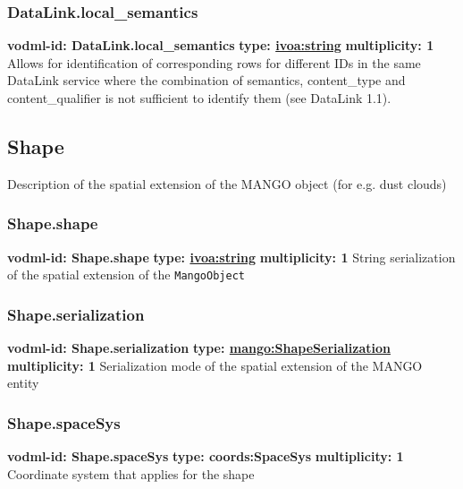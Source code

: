     \subsubsection{DataLink.local\_semantics}
    \textbf{vodml-id: DataLink.local\_semantics} \newline
    \textbf{type: \hyperref[sect:ivoa]{ivoa:string}} \newline
    \textbf{multiplicity: 1} \newline
    Allows for identification of corresponding rows for different IDs in the same DataLink service where the combination of semantics, content\_type and content\_qualifier is not sufficient to identify them (see DataLink 1.1).

  \subsection{Shape}
    \label{sect:Shape}
    Description of the spatial extension of the MANGO object (for e.g. dust clouds)

    \subsubsection{Shape.shape}
    \textbf{vodml-id: Shape.shape} \newline
    \textbf{type: \hyperref[sect:ivoa]{ivoa:string}} \newline
    \textbf{multiplicity: 1} \newline
    String serialization of the spatial extension of the \texttt{MangoObject}

    \subsubsection{Shape.serialization}
    \textbf{vodml-id: Shape.serialization} \newline
    \textbf{type: \hyperref[sect:ShapeSerialization]{mango:ShapeSerialization}} \newline
    \textbf{multiplicity: 1} \newline
    Serialization mode of the spatial extension of the MANGO entity

    \subsubsection{Shape.spaceSys}
    \textbf{vodml-id: Shape.spaceSys} \newline
    \textbf{type: coords:SpaceSys} \newline
    \textbf{multiplicity: 1} \newline
    Coordinate system that applies for the shape

